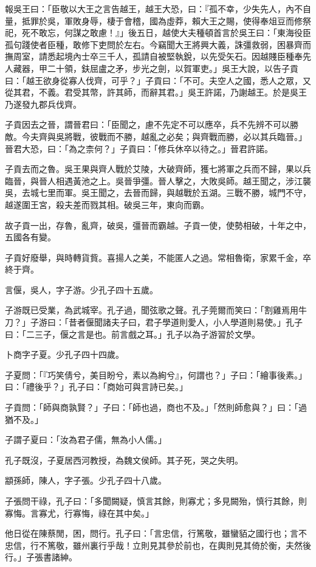 \begin{pinyinscope}
報吳王曰：「臣敬以大王之言告越王，越王大恐，曰：『孤不幸，少失先人，內不自量，抵罪於吳，軍敗身辱，棲于會稽，國為虛莽，賴大王之賜，使得奉俎豆而修祭祀，死不敢忘，何謀之敢慮！』」後五日，越使大夫種頓首言於吳王曰：「東海役臣孤句踐使者臣種，敢修下吏問於左右。今竊聞大王將興大義，誅彊救弱，困暴齊而撫周室，請悉起境內士卒三千人，孤請自被堅執銳，以先受矢石。因越賤臣種奉先人藏器，甲二十領，鈇屈盧之矛，步光之劍，以賀軍吏。」吳王大說，以告子貢曰：「越王欲身從寡人伐齊，可乎？」子貢曰：「不可。夫空人之國，悉人之眾，又從其君，不義。君受其幣，許其師，而辭其君。」吳王許諾，乃謝越王。於是吳王乃遂發九郡兵伐齊。

子貢因去之晉，謂晉君曰：「臣聞之，慮不先定不可以應卒，兵不先辨不可以勝敵。今夫齊與吳將戰，彼戰而不勝，越亂之必矣；與齊戰而勝，必以其兵臨晉。」晉君大恐，曰：「為之柰何？」子貢曰：「修兵休卒以待之。」晉君許諾。

子貢去而之魯。吳王果與齊人戰於艾陵，大破齊師，獲七將軍之兵而不歸，果以兵臨晉，與晉人相遇黃池之上。吳晉爭彊。晉人擊之，大敗吳師。越王聞之，涉江襲吳，去城七里而軍。吳王聞之，去晉而歸，與越戰於五湖。三戰不勝，城門不守，越遂圍王宮，殺夫差而戮其相。破吳三年，東向而霸。

故子貢一出，存魯，亂齊，破吳，彊晉而霸越。子貢一使，使勢相破，十年之中，五國各有變。

子貢好廢舉，與時轉貨貲。喜揚人之美，不能匿人之過。常相魯衛，家累千金，卒終于齊。

言偃，吳人，字子游。少孔子四十五歲。

子游既已受業，為武城宰。孔子過，聞弦歌之聲。孔子莞爾而笑曰：「割雞焉用牛刀？」子游曰：「昔者偃聞諸夫子曰，君子學道則愛人，小人學道則易使。」孔子曰：「二三子，偃之言是也。前言戲之耳。」孔子以為子游習於文學。

卜商字子夏。少孔子四十四歲。

子夏問：「『巧笑倩兮，美目盼兮，素以為絢兮』，何謂也？」子曰：「繪事後素。」曰：「禮後乎？」孔子曰：「商始可與言詩已矣。」

子貢問：「師與商孰賢？」子曰：「師也過，商也不及。」「然則師愈與？」曰：「過猶不及。」

子謂子夏曰：「汝為君子儒，無為小人儒。」

孔子既沒，子夏居西河教授，為魏文侯師。其子死，哭之失明。

顓孫師，陳人，字子張。少孔子四十八歲。

子張問干祿，孔子曰：「多聞闕疑，慎言其餘，則寡尤；多見闕殆，慎行其餘，則寡悔。言寡尤，行寡悔，祿在其中矣。」

他日從在陳蔡閒，困，問行。孔子曰：「言忠信，行篤敬，雖蠻貊之國行也；言不忠信，行不篤敬，雖州裏行乎哉！立則見其參於前也，在輿則見其倚於衡，夫然後行。」子張書諸紳。


\end{pinyinscope}
